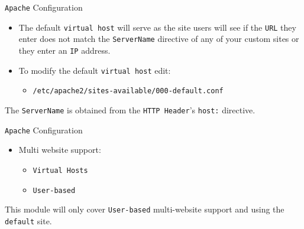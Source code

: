 \documentclass[xcolor=table,aspectratio=169]{beamer}
\begin{document}
\begin{frame}{\texttt{Apache} Configuration}
  \begin{itemize}
    \item The default \texttt{virtual host} will serve as the site users will see if the \texttt{URL} they enter does not match the \texttt{ServerName} directive of any of your custom sites or they enter an \texttt{IP} address. 
    \item To modify the default \texttt{virtual host} edit:
      \begin{itemize}
        \item \texttt{/etc/apache2/sites-available/000-default.conf}
      \end{itemize}
  \end{itemize}
  \begin{tcolorbox}
    \begin{center}
      \scriptsize The \texttt{ServerName} is obtained from the \texttt{HTTP Header}'s \texttt{host:} directive.
    \end{center}
  \end{tcolorbox}
\end{frame}

\begin{frame}{\texttt{Apache} Configuration}
  \begin{itemize}
    \item Multi website support:
      \begin{itemize}
        \item \texttt{Virtual Hosts}
        \item \texttt{User-based}
      \end{itemize}
  \end{itemize}
  \begin{tcolorbox}
    \begin{center}
      \scriptsize This module will only cover \texttt{User-based} multi-website support and using the \texttt{default} site.
    \end{center}
  \end{tcolorbox}
\end{frame}
\end{document}

